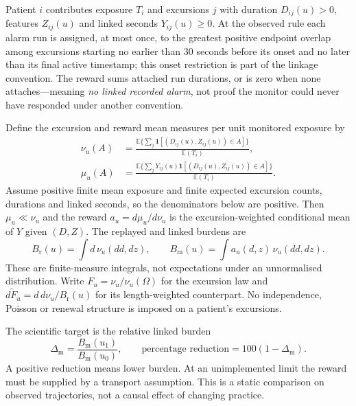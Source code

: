 \documentclass[11pt,letterpaper]{article}
\begin{document}
Patient $i$ contributes exposure $T_i$ and excursions $j$ with duration $D_{ij}(u)>0$, features $Z_{ij}(u)$ and linked seconds $Y_{ij}(u)\ge0$. At the observed rule each alarm run is assigned, at most once, to the greatest positive endpoint overlap among excursions starting no earlier than 30 seconds before its onset and no later than its final active timestamp; this onset restriction is part of the linkage convention. The reward sums attached run durations, or is zero when none attaches---meaning \emph{no linked recorded alarm}, not proof the monitor could never have responded under another convention.

Define the excursion and reward mean measures per unit monitored exposure by
\begin{equation}
\begin{split}
 \nu_u(A)&=\frac{\mathbb E\{\sum_j\mathbf 1[(D_{ij}(u),Z_{ij}(u))\in A]\}}{\mathbb E(T_i)},\\
 \mu_u(A)&=\frac{\mathbb E\{\sum_jY_{ij}(u)\mathbf 1[(D_{ij}(u),Z_{ij}(u))\in A]\}}{\mathbb E(T_i)}.
\end{split}\label{eq:measures}
\end{equation}
Assume positive finite mean exposure and finite expected excursion counts, durations and linked seconds, so the denominators below are positive. Then $\mu_u\ll\nu_u$ and the reward $a_u=d\mu_u/d\nu_u$ is the excursion-weighted conditional mean of $Y$ given $(D,Z)$. The replayed and linked burdens are
\begin{equation}
 B_{\mathrm r}(u)=\int d\,\nu_u(dd,dz),\qquad
 B_{\mathrm m}(u)=\int a_u(d,z)\,\nu_u(dd,dz).
 \label{eq:burdens}
\end{equation}
These are finite-measure integrals, not expectations under an unnormalised distribution. Write $F_u=\nu_u/\nu_u(\Omega)$ for the excursion law and $d\widetilde F_u=d\,d\nu_u/B_{\mathrm r}(u)$ for its length-weighted counterpart. No independence, Poisson or renewal structure is imposed on a patient's excursions.

The scientific target is the relative linked burden
\begin{equation}
 \Delta_{\mathrm m}=\frac{B_{\mathrm m}(u_1)}{B_{\mathrm m}(u_0)},\qquad
 \text{percentage reduction}=100(1-\Delta_{\mathrm m}).\label{eq:estimand}
\end{equation}
A positive reduction means lower burden. At an unimplemented limit the reward must be supplied by a transport assumption. This is a static comparison on observed trajectories, not a causal effect of changing practice.
\end{document}
